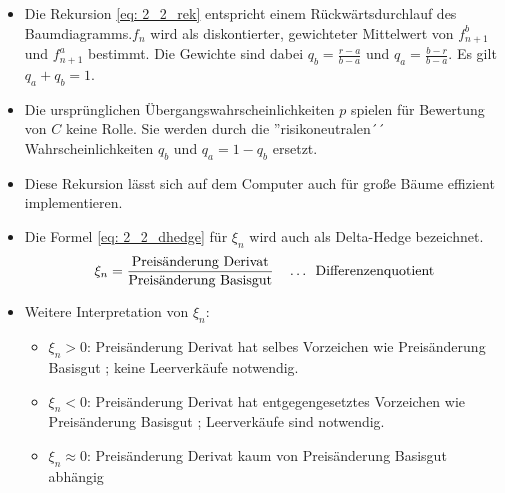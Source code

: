 \begin{*bemerkung}
	\begin{itemize}[leftmargin=*, label=$\bullet$, nolistsep]
		\item Die Rekursion \eqref{eq: 2_2_rek} entspricht einem Rückwärtsdurchlauf des Baumdiagramms.$f_n$ wird als diskontierter, gewichteter Mittelwert von $f_{n+1}^b$ und $f_{n+1}^a$ bestimmt. Die Gewichte sind dabei $q_b = \frac{r-a}{b-a}$ und $q_a = \frac{b-r}{b-a}$. Es gilt $q_a + q_b = 1$.
		\item Die ursprünglichen Übergangswahrscheinlichkeiten $p$ spielen für Bewertung von $C$ keine Rolle. Sie werden durch die ''risikoneutralen´´ Wahrscheinlichkeiten $q_b$ und $q_a = 1 - q_b$ ersetzt.
		\item Diese Rekursion lässt sich auf dem Computer auch für große Bäume effizient implementieren.
		\item Die Formel \eqref{eq: 2_2_dhedge} für $\xi_n$ wird auch als Delta-Hedge bezeichnet.
		\begin{equation*}
			\xi_n = \frac{\text{Preisänderung Derivat}}{\text{Preisänderung Basisgut}} \quad \dots \enskip \text{Differenzenquotient}
		\end{equation*}
		\item Weitere Interpretation von $\xi_n$:
		\begin{itemize}
			\item $\xi_n > 0$: Preisänderung Derivat hat selbes Vorzeichen wie Preisänderung Basisgut ; keine Leerverkäufe notwendig.
			\item $\xi_n < 0$: Preisänderung Derivat hat entgegengesetztes Vorzeichen wie Preisänderung Basisgut ; Leerverkäufe sind notwendig.
			\item $\xi_n \approx 0$: Preisänderung Derivat kaum von Preisänderung Basisgut abhängig
		\end{itemize}
	\end{itemize}
\end{*bemerkung}

